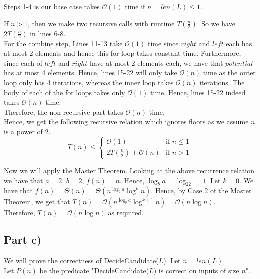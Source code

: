 \documentclass[12pt]{article}
\begin{document}
Steps 1-4 is our base case takes $\mathcal{O}(1)$ time if $n = len(L) \leq 1$.

If $n > 1$, then we make two recursive calls with runtime $T(\frac{n}{2})$. So we have $2T(\frac{n}{2})$ in lines 6-8. \\

For the combine step, Lines 11-13 take $\mathcal{O}(1)$ time since $right$ and $left$ each has at most 2 elements and hence this for loop takes constant time. Furthermore, since each of $left$ and $right$ have at most 2 elements each, we have that $potential$ has at most 4 elements. Hence, lines 15-22 will only take $\mathcal{O}(n)$ time as the outer loop only has 4 iterations, whereas the inner loop takes $\mathcal{O}(n)$ iterations. The body of each of the for loops takes only $\mathcal{O}(1)$ time. Hence, lines 15-22 indeed takes $\mathcal{O}(n)$ time. \\

Therefore, the non-recursive part takes $\mathcal{O}(n)$ time. \\

Hence, we get the following recursive relation which ignores floors as we assume $n$ is a power of 2. \\

\[
  T(n) \leq
  \begin{cases}
        \mathcal{O}(1) & \text{if $n \leq 1$} \\
        2T(\frac{n}{2}) + \mathcal{O}(n) & \text{if $n > 1$} 
  \end{cases}
\]

Now we will apply the Master Theorem. Looking at the above recurrence relation we have that $a = 2$, $b = 2$, $f(n) = n$. Hence, $\log_ba = \log_22 = 1$. Let $k = 0$. We have that $f(n) = \Theta(n) = \Theta(n^{\log_ba}\log^kn)$. Hence, by Case 2 of the Master Theorem, we get that $T(n) = \mathcal{O}(n^{\log_ba}\log^{k+1}n) = \mathcal{O}(n\log n)$. \\

Therefore, $T(n) = \mathcal{O}(n\log n)$ as required. 

\subsection*{Part c)}

We will prove the correctness of DecideCandidate($L$). Let $n = len(L)$. \\

Let $P(n)$ be the predicate "DecideCandidate($L$) is correct on inputs of size $n$". \\
\end{document}
